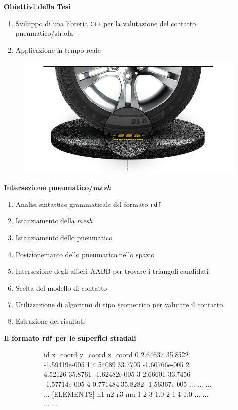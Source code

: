 \documentclass[xcolor=dvipsnames]{beamer} %
\begin{document}
\begin{frame}
	\Large{\textbf{Obiettivi della Tesi}}
	\normalsize
	\begin{enumerate}
		\item Sviluppo di una libreria \texttt{C++} per la valutazione del contatto pneumatico/strada
		\item Applicazione in tempo reale
	\end{enumerate}
	\begin{figure}
		\centering
		\includegraphics[width=0.6\linewidth]{../Figures/contact}
	\end{figure}
\end{frame}

\begin{frame}
	\Large{\textbf{Intersezione pneumatico/\textit{mesh}}}
	\normalsize
	\begin{enumerate}
		\item Analisi sintattico-grammaticale del formato \texttt{rdf}
		\item Istanziamento della \textit{mesh}
		\item Istanziamento dello pneumatico
		\item Posizionemanto dello pneumatico nello spazio
		\item Intersezione degli alberi AABB per trovare i triangoli candidati
		\item Scelta del modello di contatto
		\item Utilizzazione di algoritmi di tipo geometrico per valutare il contatto
		\item Estrazione dei risultati
	\end{enumerate}
\end{frame}

\begin{frame}[fragile]
	\Large{\textbf{Il formato \texttt{rdf} per le superfici stradali}}
	\normalsize
	\begin{figure}
		\centering
		\begin{subfigure}{\linewidth}
\begin{pseudoc}
[NODES]
{ id x_coord y_coord z_coord }
0 2.64637 35.8522 -1.59419e-005 
1 4.54089 33.7705 -1.60766e-005 
2 4.52126 35.8761 -1.62482e-005 
3 2.66601 33.7456 -1.57714e-005 
4 0.771484 35.8282 -1.56367e-005 
... ... ... ...
[ELEMENTS]
{ n1 n2 n3 mu }
1 2 3 1.0 
2 1 4 1.0 
... ... ... ...
\end{pseudoc}
		\end{subfigure}
	\end{figure}
\end{frame}
\end{document}

